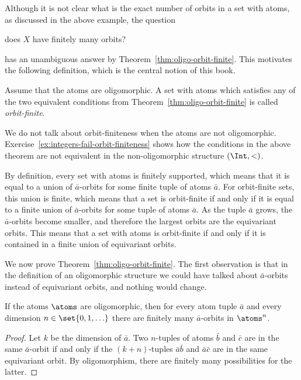 Although it is not clear what is the exact number of orbits in a set with atoms, as discussed in the above example, the question
\begin{center}
   does $X$ have finitely many orbits?
\end{center}
has an unambiguous answer by Theorem~\ref{thm:oligo-orbit-finite}. This motivates the following definition, which is the central notion of this book.
\begin{definition}
   Assume that the atoms are oligomorphic. 
   A set with atoms which satisfies any of the two equivalent conditions from Theorem~\ref{thm:oligo-orbit-finite} is called \emph{orbit-finite}.	
\end{definition}
We do not talk about orbit-finiteness when the atoms are not oligomorphic. Exercise~\ref{ex:integers-fail-orbit-finiteness} shows how the conditions in the above theorem are not equivalent in the non-oligomorphic structure $(\Int,<)$. 


By definition, every set with atoms is finitely supported, which means that it is equal to a union of $\bar a$-orbits for some finite tuple of atoms $\bar a$. For orbit-finite sets, this union is finite, which means that a set is orbit-finite if and only if it is equal to a finite union of $\bar a$-orbits for some tuple of atoms $\bar a$. As the tuple $\bar a$ grows, the $\bar a$-orbits become smaller, and therefore the largest orbits are the equivariant orbits. This means that a set with atoms is orbit-finite if and only if it is contained in a finite union of equivariant orbits. 


We now prove Theorem~\ref{thm:oligo-orbit-finite}. 
The first observation is that in the definition of an oligomorphic structure we could have talked about $\bar a$-orbits instead of equivariant orbits, and nothing would change.

\begin{lemma}\label{lem:oligomorphic-non-equivariant}
If the atoms $\atoms$ are oligomorphic, then for every atom tuple $\bar a$ and every dimension $n \in \set{0,1,\ldots}$ there are finitely many $\bar a$-orbits in $\atoms^n$.
\end{lemma}
\begin{proof}
Let $k$ be the dimension of $\bar a$. Two $n$-tuples of atoms $\bar b$ and $\bar c$ are in the same $\bar a$-orbit if and only if the $(k+n)$-tuples $\bar a \bar b$ and $\bar a \bar c$ are in the same equivariant orbit. By oligomorphism, there are finitely many possibilities for the latter. \end{proof}

